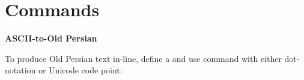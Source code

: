 \documentclass{article}
\begin{document}
%
%
%
%
%
%
%
%
%
\section{Commands}
\textbf{\textsc{ASCII}-to-Old Persian}

To produce Old Persian text in-line, define a \cs{\opfont} and use command \cs{\optrans} with either dot-notation or Unicode code point:
\end{document}
